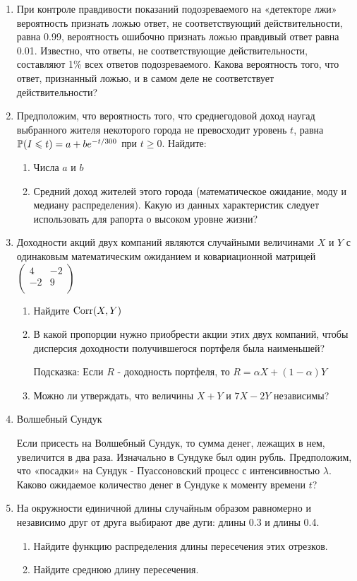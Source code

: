 \begin{enumerate}
\item При контроле правдивости показаний подозреваемого на «детекторе лжи» вероятность признать ложью ответ, не соответствующий действительности, равна 0.99, вероятность ошибочно признать ложью правдивый ответ равна 0.01. Известно, что ответы, не соответствующие действительности, составляют 1\% всех ответов подозреваемого.
Какова вероятность того, что ответ, признанный ложью, и в самом деле не соответствует действительности?
\item Предположим, что вероятность того, что среднегодовой доход наугад выбранного жителя некоторого города не превосходит уровень $t$, равна $\P(I\le t)=a+be^{-t/300}$ при $t\ge 0$.
Найдите:
\begin{enumerate}
\item Числа $a$ и $b$
\item Средний доход жителей этого города (математическое ожидание, моду и медиану распределения). Какую из данных характеристик следует использовать для рапорта о высоком уровне жизни?
\end{enumerate}

\item Доходности акций двух компаний являются случайными величинами $X$ и $Y$ с одинаковым математическим ожиданием и ковариационной матрицей $\left( \begin{array}{cc}
   4 & -2  \\
   -2 & 9  \\
\end{array}\right)$
\begin{enumerate}
\item Найдите $\Corr(X,Y)$
\item В какой пропорции нужно приобрести акции этих двух компаний, чтобы дисперсия доходности получившегося портфеля была наименьшей?

Подсказка: Если $R$ - доходность портфеля, то $R=\alpha X+(1-\alpha)Y$
\item Можно ли утверждать, что величины $X+Y$ и $7X-2Y$ независимы?
\end{enumerate}

\item Волшебный Сундук

Если присесть на Волшебный Сундук, то сумма денег, лежащих в нем, увеличится в два раза. Изначально в Сундуке был один рубль. Предположим, что «посадки» на Сундук - Пуассоновский процесс с интенсивностью $\lambda$. Каково ожидаемое количество денег в Сундуке к моменту времени $t$?

\item На окружности единичной длины случайным образом равномерно и независимо друг от друга выбирают две дуги: длины 0.3 и длины 0.4.
\begin{enumerate}
\item Найдите функцию распределения длины пересечения этих отрезков.
\item Найдите среднюю длину пересечения.
\end{enumerate}
\end{enumerate}

